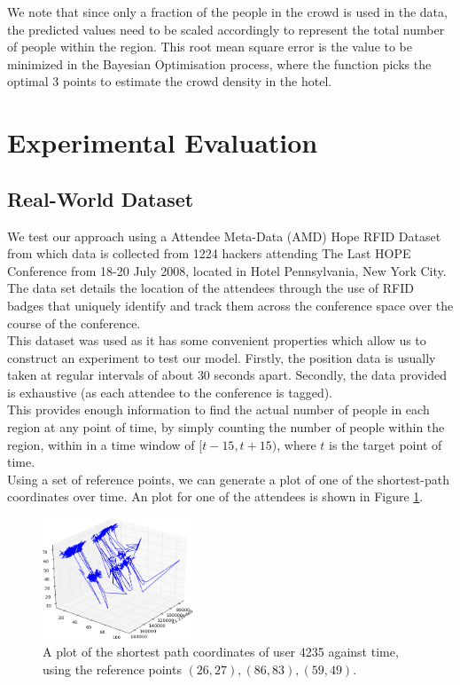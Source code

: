 \documentclass[letterpaper]{article}
\begin{document}
We note that since only a fraction of the people in the crowd is used in the data, the predicted values need to be scaled accordingly to represent the total number of people within the region. This root mean square error is the value to be minimized in the Bayesian Optimisation process, where the function picks the optimal 3 points to estimate the crowd density in the hotel.

\section{Experimental Evaluation}

\subsection{Real-World Dataset}

We test our approach using a Attendee Meta-Data (AMD) Hope RFID Dataset from which data is collected from 1224 hackers attending The Last HOPE Conference from 18-20 July 2008, located in Hotel Pennsylvania, New York City.\\

The data set details the location of the attendees through the use of RFID badges that uniquely identify and track them across the conference space over the course of the conference.\\

This dataset was used as it has some convenient properties which allow us to construct an experiment to test our model. Firstly, the position data is usually taken at regular intervals of about $30$ seconds apart. Secondly, the data provided is exhaustive (as each attendee to the conference is tagged). \\

This provides enough information to find the actual number of people in each region at any point of time, by simply counting the number of people within the region, within in a time window of $[t-15,t+15)$, where $t$ is the target point of time.\\

Using a set of reference points, we can generate a plot of one of the shortest-path coordinates over time. An plot for one of the attendees is shown in Figure \ref{fig:datasetshortestpaths}.\\

\begin{figure}[!h]
  \centering
    \includegraphics[width=170px]{diagrams/datasetshortestpaths.png}
  \caption{A plot of the shortest path coordinates of user 4235 against time, using the reference points $(26,27),(86,83),(59,49)$.}
  \label{fig:datasetshortestpaths}
\end{figure}
\end{document}
